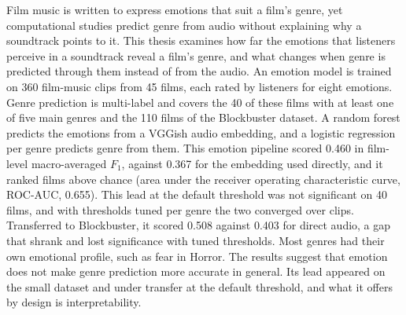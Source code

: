 
Film music is written to express emotions that suit a film's genre, yet computational studies
predict genre from audio without explaining why a soundtrack points to it. This thesis examines
how far the emotions that listeners perceive in a soundtrack reveal a film's genre, and what
changes when genre is predicted through them instead of from the audio. An emotion model is
trained on 360 film-music clips from 45 films, each rated by listeners for eight emotions.
Genre prediction is multi-label and covers the 40 of these films with at least one of five main genres
and the 110 films of the Blockbuster dataset. A random forest predicts the emotions from a VGGish audio embedding, and a logistic regression per genre predicts genre from
them. This emotion pipeline scored 0.460 in film-level macro-averaged $F_1$, against 0.367 for the embedding used directly, and it ranked films above chance (area under the receiver operating characteristic curve, ROC-AUC, 0.655).
This lead at the default threshold was not significant on 40 films, and with thresholds tuned
per genre the two converged over clips. Transferred to Blockbuster, it scored 0.508 against 0.403 for direct audio, a gap that shrank and lost significance with
tuned thresholds. Most genres had their own emotional profile, such as fear in Horror. The
results suggest that emotion does not make genre prediction more accurate in general. Its lead
appeared on the small dataset and under transfer at the default threshold, and what it offers by design is interpretability.
